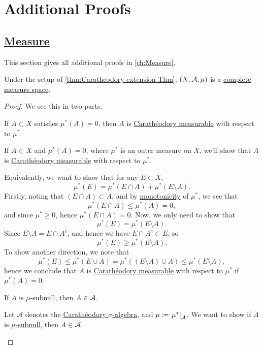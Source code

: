 \chapter{Additional Proofs}\label{Apx:Additional-Proofs}
\section{\hyperref[ch:Measure]{Measure}}
This section gives all additional proofs in \autoref{ch:Measure}.
\begin{theorem}\label{thm:Caratheodory-extension-Thm:3.}
	Under the setup of \autoref{thm:Caratheodory-extension-Thm}, \((X, \mathcal{\MakeUppercase{a}} , \mu )\) is a \hyperref[def:complete-measure-space]{complete measure space}.
\end{theorem}
\begin{proof}
	We see this in two parts.
	\begin{claim}
		If \(A\subset X\) satisfies \(\mu ^{*} (A) = 0\), then \(A\) is \hyperref[def:C-measurable]{Carathéodory measurable} with respect to \(\mu ^{\ast} \).
	\end{claim}
	\begin{explanation}
		If \(A\subset X\) and \(\mu^{*} (A) = 0\), where \(\mu^{*} \) is an outer measure on \(X\), we'll show that \(A\) is \hyperref[def:C-measurable]{Carathéodory measurable}
		with respect to \(\mu^{*} \).

		\par Equivalently, we want to show that for any \(E\subset X\),
		\[
			\mu^{*} (E) = \mu^{*} (E\cap A) + \mu^{*} (E \setminus A).
		\]
		Firstly, noting that \((E\cap A)\subset A\), and by \hyperref[def:outer-measure-montonicity]{monotonicity} of \(\mu^{*} \), we see that
		\[
			\mu^{*} (E\cap A)\leq \mu^{*} (A) = 0,
		\]
		and since \(\mu^{*} \geq 0\), hence \(\mu^{*} (E\cap A) = 0\). Now, we only need to show that
		\[
			\mu^{*} (E) = \mu^{*} (E\setminus A).
		\]
		Since \(E\setminus A = E\cap A^{c} \), and hence we have \(E\cap A^{c} \subset E\), so
		\[
			\mu^{*} (E)\geq \mu^{*} (E\setminus A).
		\]
		To show another direction, we note that
		\[
			\mu^{*} (E)\leq \mu^{*} (E\cup A) = \mu^{*} ((E\setminus A) \cup A) \leq \mu^{*} (E\setminus A),
		\]
		hence we conclude that \(A\) is \hyperref[def:C-measurable]{Carathéodory measurable} with respect to \(\mu^{*} \) if \(\mu^{*} (A)=0\).
	\end{explanation}

	\begin{claim}
		If \(A\) is \hyperref[def:mu-subnull-set]{\(\mu\)-subnull}, then \(A\in \mathcal{\MakeUppercase{a}} \).
	\end{claim}
	\begin{explanation}
		Let \(\mathcal{A} \) denotes the \hyperref[thm:Caratheodory-extension-Thm]{Carathéodory \(\sigma\)-algebra}, and \(\mu\coloneqq \left.\mu^{*} \right\vert_{\mathcal{A} }^{} \). We want to show if
		\(A\) is \hyperref[def:mu-subnull-set]{\(\mu\)-subnull}, then \(A\in\mathcal{A} \).


\end{explanation}
\end{proof}
